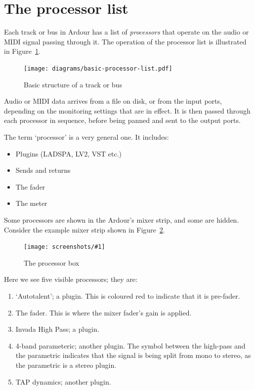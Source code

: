\documentclass[10pt,a4paper]{book}
\newcommand{\screenshot}[3]{%
\begin{figure}[ht]%
\begin{center}
\texttt{[image: screenshots/\#1]}
\end{center}
\caption{#2}
\label{#3}
\end{figure}}
\begin{document}
\section{The processor list}

Each track or bus in Ardour has a list of \emph{processors} that
operate on the audio or MIDI signal passing through it.  The operation
of the processor list is illustrated in
Figure~\ref{fig:basic-processor-list}.

\begin{figure}[ht]
\begin{center}
\texttt{[image: diagrams/basic-processor-list.pdf]}
\end{center}
\caption{Basic structure of a track or bus}
\label{fig:basic-processor-list}
\end{figure}

Audio or MIDI data arrives from a file on disk, or from the input
ports, depending on the monitoring settings that are in effect.  It is
then passed through each processor in sequence, before being panned
and sent to the output ports.

The term `processor' is a very general one.  It includes:

\begin{itemize}
\item Plugins (LADSPA, LV2, VST etc.)
\item Sends and returns
\item The fader
\item The meter
\end{itemize}

Some processors are shown in the Ardour's mixer strip, and some are
hidden.  Consider the example mixer strip shown in Figure~\ref{fig:processor-box}.

\screenshot{processor-box.png}{The processor box}{fig:processor-box}

Here we see five visible processors; they are:

\begin{enumerate}
\item `Autotalent'; a plugin.  This is coloured red to indicate
  that it is pre-fader.
\item The fader.  This is where the mixer fader's gain is applied.
\item Invada High Pass; a plugin.
\item 4-band parameteric; another plugin.  The symbol between the
  high-pass and the parametric indicates that the signal is being
  split from mono to stereo, as the parametric is a stereo plugin.
\item TAP dynamics; another plugin.
\end{enumerate}
\end{document}
